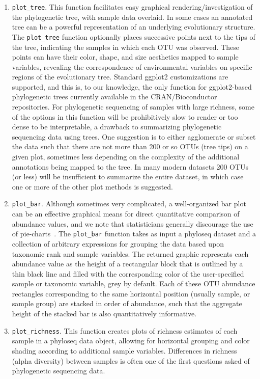 \documentclass[10pt]{article}\usepackage{graphicx, color}
\newcommand{\code}[1]{{\texttt{#1}}}
\begin{document}
\begin{enumerate}
\item \code{plot{\_}tree}.
This function facilitates easy graphical rendering/investigation
of the phylogenetic tree, with sample data overlaid.
In some cases an annotated tree
can be a powerful representation
of an underlying evolutionary structure.
The \code{plot{\_}tree} function
optionally places successive points next to the tips of the tree,
indicating the samples in which each OTU was observed.
These points can have their color, shape, and size aesthetics
mapped to sample variables,
revealing the correspondence of
environmental variables on specific regions 
of the evolutionary tree.
Standard ggplot2 customizations are supported, 
and this is, to our knowledge, the only function
for ggplot2-based phylogenetic trees
currently available 
in the CRAN/Bioconductor repositories.
For phylogenetic sequencing of samples with large richness,
some of the options in this function will be
prohibitively slow to render or too dense to be interpretable,
a drawback to summarizing
phylogenetic sequencing data using trees.
One suggestion is to either agglomerate or subset the data
such that there are not more than 200 or so OTUs (tree tips) on a given plot,
sometimes less depending on the complexity
of the additional annotations being mapped to the tree.
In many modern datasets 200 OTUs (or less) will be insufficient
to summarize the entire dataset,
in which case one or more of the other plot methods is suggested.

\item \code{plot{\_}bar}.
Although sometimes very complicated, 
a well-organized bar plot can be an effective graphical means
for direct quantitative comparison of abundance values,
and we note that statisticians generally discourage
the use of pie-charts~\cite{Tufte:1983vw}.
The \code{plot{\_}bar} function
takes as input a phyloseq dataset and 
a collection of arbitrary expressions
for grouping the data based upon
taxonomic rank and sample variables.
The returned graphic represents each abundance value
as the height of a rectangular block
that is outlined by a thin black line
and filled with the corresponding color of
the user-specified sample or taxonomic variable, grey by default.
Each of these OTU abundance rectangles corresponding to
the same horizontal position (usually sample, or sample group)
are stacked in order of abundance,
such that the aggregate height of the stacked bar
is also quantitatively informative. 

\item \code{plot{\_}richness}.
This function creates plots of richness estimates
of each sample in a phyloseq data object,
allowing for horizontal grouping and color shading
according to additional sample variables.
Differences in richness (alpha diversity) between samples
is often one of the first questions asked 
of phylogenetic sequencing data.

\end{enumerate} 
\end{document}
